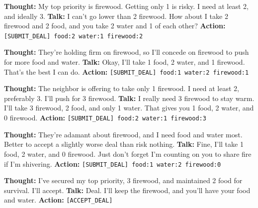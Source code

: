 \documentclass{interact}
\theoremstyle{plain}
\theoremstyle{definition}
\theoremstyle{remark}
\begin{document}
\begin{neighborbox}
\textbf{Thought:} My top priority is firewood. Getting only 1 is risky. I need at least 2, and ideally 3.\newline
\textbf{Talk:} I can't go lower than 2 firewood. How about I take 2 firewood and 2 food, and you take 2 water and 1 of each other?\newline
\textbf{Action:} \texttt{[SUBMIT\_DEAL] food:2 water:1 firewood:2}
\end{neighborbox}

\begin{camperbox}
\textbf{Thought:} They're holding firm on firewood, so I'll concede on firewood to push for more food and water.\newline
\textbf{Talk:} Okay, I'll take 1 food, 2 water, and 1 firewood. That's the best I can do.\newline
\textbf{Action:} \texttt{[SUBMIT\_DEAL] food:1 water:2 firewood:1}
\end{camperbox}

\begin{neighborbox}
\textbf{Thought:} The neighbor is offering to take only 1 firewood. I need at least 2, preferably 3. I'll push for 3 firewood.\newline
\textbf{Talk:} I really need 3 firewood to stay warm. I'll take 3 firewood, 2 food, and only 1 water. That gives you 1 food, 2 water, and 0 firewood.\newline
\textbf{Action:} \texttt{[SUBMIT\_DEAL] food:2 water:1 firewood:3}
\end{neighborbox}

\begin{camperbox}
\textbf{Thought:} They're adamant about firewood, and I need food and water most. Better to accept a slightly worse deal than risk nothing.\newline
\textbf{Talk:} Fine, I'll take 1 food, 2 water, and 0 firewood. Just don't forget I'm counting on you to share fire if I'm shivering.\newline
\textbf{Action:} \texttt{[SUBMIT\_DEAL] food:1 water:2 firewood:0}
\end{camperbox}

\begin{neighborbox}
\textbf{Thought:} I've secured my top priority, 3 firewood, and maintained 2 food for survival. I'll accept.\newline
\textbf{Talk:} Deal. I'll keep the firewood, and you'll have your food and water.\newline
\textbf{Action:} \texttt{[ACCEPT\_DEAL]}
\end{neighborbox}
\end{document}
